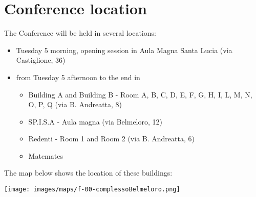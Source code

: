 
\section*{Conference location}
The Conference will be held in several locations: 

\begin{itemize}
  \item Tuesday 5 morning, opening session in Aula Magna Santa Lucia (via Castiglione, 36)
  \item from Tuesday 5 afternoon to the end in
\begin{itemize}
\item Building A and Building B - Room A, B, C, D, E, F, G, H, I, L, M, N, O, P, Q (via B. Andreatta, 8)
\item SP.I.S.A - Aula magna (via Belmeloro, 12)
\item Redenti - Room 1 and Room 2 (via B. Andreatta, 6)
\item Matemates
\end{itemize}
\end{itemize}

\bigskip

\noindent The map below shows the location of these buildings:

\bigskip

\texttt{[image: images/maps/f-00-complessoBelmeloro.png]}

\newpage



